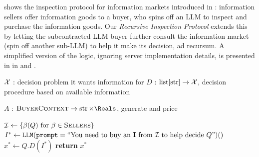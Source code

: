  shows the inspection protocol for information markets introduced in : information sellers offer information goods to a buyer, who spins off an LLM to inspect and purchase the information goods. Our \emph{Recursive Inspection Protocol} extends this by letting the subcontracted LLM buyer further consult the information market (spin off another sub-LLM) to help it make its decision, ad recursum. A simplified version of the logic, ignoring server implementation details, is presented in in  and .

\begin{algorithm}[tb]
\caption{One-level Inspection Protocol from }
\label{alg:im}
\begin{algorithmic}

\Struct{\BuyerContext}
  \State $\mathcal{X}$ : decision problem it wants information for
  \State $D$ : $\operatorname{list}[\operatorname{str}]\to\mathcal{X}$, decision procedure based on available information
\EndStruct

\Struct{\Seller}
  \State $A$ : $\BuyerContext\to\operatorname{str}\times\Reals$, generate \InfoOffer{} and price
\EndStruct

\State{}
\State $\mathcal{I}\gets \{\beta(Q)\text{ for }\beta\in\textsc{Sellers}\}$
\State{}
\State $I^*\gets\texttt{LLM}(\texttt{prompt}=\text{``You need to buy an $\mathbf{I}$ from $\mathcal{I}$ to help decide $Q$''})()$
\State{}
\State $x^*\gets Q.D(I^*)$
\State \textbf{return} $x^*$
\EndProcedure

\end{algorithmic}
\end{algorithm}


